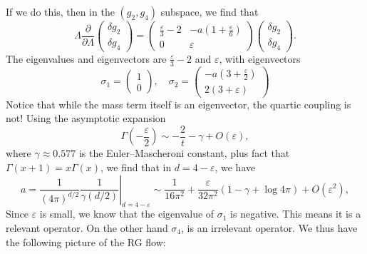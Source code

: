 \documentclass[a4paper]{article}
\begin{document}
If we do this, then in the $(g_2, g_4)$ subspace, we find that
\[
  \Lambda \frac{\partial}{\partial \Lambda}
  \begin{pmatrix}
    \delta g_2\\
    \delta g_4
  \end{pmatrix} =
  \begin{pmatrix}
    \frac{\varepsilon}{3} - 2 & -a \left( 1+ \frac{\varepsilon}{6}\right)\\
    0 & \varepsilon
  \end{pmatrix}
  \begin{pmatrix}
    \delta g_2\\
    \delta g_4
  \end{pmatrix}.
\]
The eigenvalues and eigenvectors are $\frac{\varepsilon}{3} - 2$ and $\varepsilon$, with eigenvectors
\[
  \sigma_1=
  \begin{pmatrix}
    1\\0
  \end{pmatrix},\quad
  \sigma_2 =
  \begin{pmatrix}
    -a\left(3 + \frac{\varepsilon}{2}\right)\\
    2(3 + \varepsilon)
  \end{pmatrix}
\]
Notice that while the mass term itself is an eigenvector, the quartic coupling is not! Using the asymptotic expansion
\[
  \Gamma\left(-\frac{\varepsilon}{2}\right) \sim -\frac{2}{t} - \gamma + O(\varepsilon),
\]
where $\gamma \approx 0.577$ is the Euler--Mascheroni constant, plus fact that $\Gamma(x + 1) = x \Gamma(x)$, we find that in $d = 4 - \varepsilon$, we have
\[
  a = \left.\frac{1}{(4\pi)^{d/2}} \frac{1}{\gamma(d/2)} \right|_{d = 4 - \varepsilon} \sim \frac{1}{16 \pi^2} + \frac{\varepsilon}{32\pi^2} (1 - \gamma + \log 4\pi) + O(\varepsilon^2),
\]
Since $\varepsilon$ is small, we know that the eigenvalue of $\sigma_1$ is negative. This means it is a relevant operator. On the other hand $\sigma_4$, is an irrelevant operator. We thus have the following picture of the RG flow:
\end{document}
